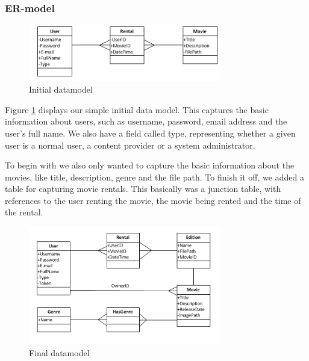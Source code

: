 \subsubsection{ER-model}
\label{Design_Database_Analysis_ERmodel}

\begin{figure}[h!]  
  \centering
    \includegraphics[width=0.75\textwidth]{Parts/Images/Design/Database/Datamodel_Initial}
  \caption{Initial datamodel}
  \label{fig:Design_Database_Analysis_ERmodel_Initial}
\end{figure}

Figure \ref{fig:Design_Database_Analysis_ERmodel_Initial} displays our simple initial data model. This captures the basic information about users, such as username, password, email address and the user's full name. We also have a field called type, representing whether a given user is a normal user, a content provider or a system administrator.

To begin with we also only wanted to capture the basic information about the movies, like title, description, genre and the file path. To finish it off, we added a table for capturing movie rentals. This basically was a junction table, with references to the user renting the movie, the movie being rented and the time of the rental.

\begin{figure}[h!]  
  \centering
    \includegraphics[width=0.75\textwidth]{Parts/Images/Design/Database/Datamodel_final}
  \caption{Final datamodel}
  \label{fig:Design_Database_Analysis_ERmodel_Final}
\end{figure}

